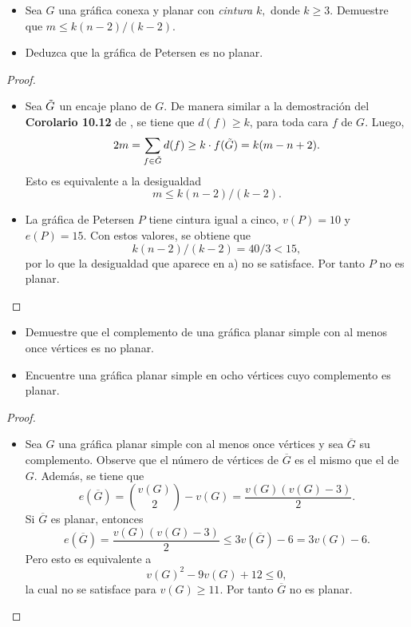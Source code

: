 \documentclass[12pt]{article}
\newenvironment{problem}[2][Problema]{\begin{trivlist}
\item[\hskip \labelsep {\bfseries #1}\hskip \labelsep {\bfseries #2.}]}{\end{trivlist}}
\begin{document}
\begin{problem}{10.3.2}
\text{ }
\begin{itemize}
    \item[a)] Sea $G$ una gráfica conexa y planar con \textit{cintura} $k,$ donde $k \geq 3.$ Demuestre que $m \leq k(n-2) / (k-2).$ 
    \item[b)] Deduzca que la gráfica de Petersen es no planar.
\end{itemize}
\end{problem}
\begin{proof} \textbf{}
\begin{itemize}
    \item[a)] Sea $\Tilde{G}$ un encaje plano de $G$. De manera similar a la demostración del \textbf{Corolario 10.12} de \cite{10.5555/1481153}, se tiene que $d(f) \geq k$, para toda cara $f$ de $G.$  Luego,
    $$2m = \sum_{f \in \Tilde{G}} d(f) \geq k \cdot f(\Tilde{G}) = k (m - n + 2).$$ 
    Esto es equivalente a la desigualdad
    $$m \leq k(n-2) / (k-2).$$
    \item[b)] La gráfica de Petersen $P$ tiene cintura igual a cinco, $v(P) = 10$ y $e(P) = 15.$ Con estos valores, se obtiene que 
    $$k(n-2) / (k-2) = 40/3 < 15, $$
    por lo que la desigualdad que aparece en a) no se satisface. Por tanto $P$ no es planar.
\end{itemize}
\end{proof} 




\begin{problem}{10.3.4}
\text{ }
\begin{itemize}
    \item[a)] Demuestre que el complemento de una gráfica planar simple con al menos once vértices es no planar.
    \item[b)] Encuentre una gráfica planar simple en ocho vértices cuyo complemento es planar.
\end{itemize}
\end{problem}
\begin{proof}
\textbf{}
\begin{itemize}
        \item[a)] Sea $G$ una gráfica planar simple con al menos once vértices y sea $\overline{G}$ su complemento. Observe que el número de vértices de $\overline{G}$ es el mismo que el de $G.$ Además, se tiene que $$e(\overline{G}) = {v(G) \choose 2} - v(G) =  \frac{v(G)(v(G) - 3)}{2}.$$
        Si $\overline{G}$ es planar, entonces
        $$e(\overline{G}) =  \frac{v(G)(v(G) - 3)}{2} \leq 3 v(\overline{G}) - 6 = 3 v(G) - 6 .$$
        Pero esto es equivalente a 
        $$ v(G)^2 - 9 v(G) + 12 \leq 0,$$
        la cual no se satisface para $v(G) \geq 11.$ Por tanto $\overline{G}$ no es planar.
\end{itemize}
\end{proof}
\end{document}
